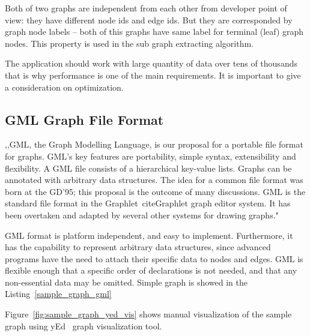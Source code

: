 Both of two graphs are independent from each other from developer point of view: they have different node ids and edge ids. But they are corresponded by graph node labels -- both of this graphs have same label for terminal (leaf) graph nodes. This property is used in the sub graph extracting algorithm.


The application should work with large quantity of data over tens of thousands that is why performance is one of the main requirements. It is important to give a consideration on optimization.

\subsection{GML Graph File Format}
 ,,GML, the Graph Modelling Language, is our proposal for a portable file format for graphs. GML's key features are portability, simple syntax, extensibility and flexibility. A GML file consists of a hierarchical key-value lists. Graphs can be annotated with arbitrary data structures. The idea for a common file format was born at the GD'95; this proposal is the outcome of many discussions. GML is the standard file format in the Graphlet~cite{Graphlet} graph editor system. It has been overtaken and adapted by several other systems for drawing graphs."~\cite{GML}


GML format is platform independent, and easy to implement. Furthermore, it has the capability to represent arbitrary data structures, since advanced programs have the need to attach their specific data to nodes and edges. GML is flexible enough that a specific order of declarations is not needed, and that any non-essential data may be omitted. Simple graph is showed in the Listing~\ref{sample_graph_gml}

\begin{center}
	
\end{center}

Figure~\ref{fig:sample_graph_yed_vis} shows manual visualization of the sample graph using yEd~\cite{yed} graph visualization tool.

